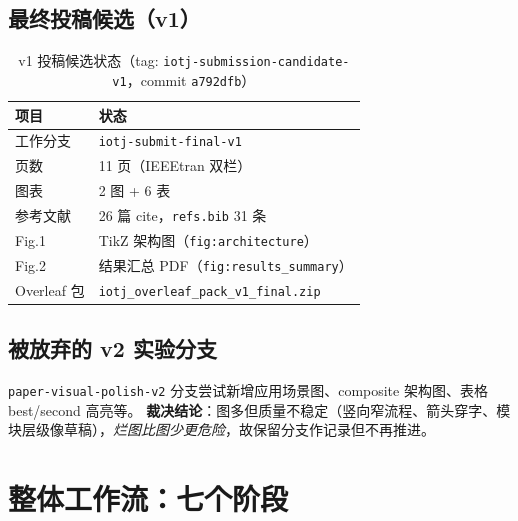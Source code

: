 \documentclass[11pt,a4paper]{ctexart}
\begin{document}
\subsection{最终投稿候选（v1）}
\begin{table}[htbp]
  \centering
  \caption{v1 投稿候选状态（tag: \texttt{iotj-submission-candidate-v1}，commit \texttt{a792dfb}）}
  \begin{tabular}{@{}ll@{}}
    \toprule
    \textbf{项目} & \textbf{状态} \\
    \midrule
    工作分支 & \texttt{iotj-submit-final-v1} \\
    页数 & 11 页（IEEEtran 双栏） \\
    图表 & 2 图 + 6 表 \\
    参考文献 & 26 篇 cite，\texttt{refs.bib} 31 条 \\
    Fig.1 & TikZ 架构图（\texttt{fig:architecture}） \\
    Fig.2 & 结果汇总 PDF（\texttt{fig:results\_summary}） \\
    Overleaf 包 & \texttt{iotj\_overleaf\_pack\_v1\_final.zip} \\
    \bottomrule
  \end{tabular}
\end{table}

\subsection{被放弃的 v2 实验分支}
\texttt{paper-visual-polish-v2} 分支尝试新增应用场景图、composite 架构图、表格 best/second 高亮等。
\textbf{裁决结论}：图多但质量不稳定（竖向窄流程、箭头穿字、模块层级像草稿），\emph{烂图比图少更危险}，故保留分支作记录但不再推进。

\section{整体工作流：七个阶段}
\end{document}
